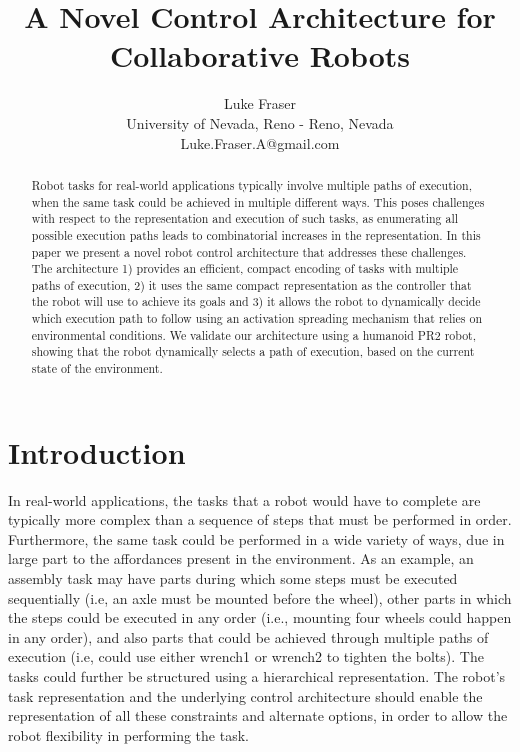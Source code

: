 \documentclass[conference]{article}
\title{A Novel Control Architecture for Collaborative Robots}
\author{Luke Fraser \\ 
University of Nevada, Reno - Reno, Nevada\\
Luke.Fraser.A@gmail.com}
\begin{document}
\maketitle

\begin{abstract}
  Robot tasks for real-world applications typically involve multiple paths of execution, when the same task could be achieved in multiple different ways. This poses challenges with respect to the representation and execution of such tasks, as enumerating all possible execution paths leads to combinatorial increases in the representation. In this paper we present a novel robot control architecture that addresses these challenges. The architecture 1) provides an efficient, compact encoding of tasks with multiple paths of execution, 2) it uses the same compact representation as the controller that the robot will use to achieve its goals and 3) it allows the robot to dynamically decide which execution path to follow using an activation spreading mechanism that relies on environmental conditions. We validate our architecture using a humanoid PR2 robot, showing that the robot dynamically selects a path of execution, based on the current state of the environment.
\end{abstract}

\section{Introduction}
In real-world applications, the tasks that a robot would have to complete are typically more complex than a sequence of steps that must be performed in order. Furthermore, the same task could be performed in a wide variety of ways, due in large part to the affordances present in the environment. As an example, an assembly task may have parts during which some steps must be executed sequentially (i.e, an axle must be mounted before the wheel), other parts in which the steps could be executed in any order (i.e., mounting four wheels could happen in any order), and also parts that could be achieved through multiple paths of execution (i.e, could use either wrench1 or wrench2 to tighten the bolts). The tasks could further be structured using a hierarchical representation. The robot's task representation and the underlying control architecture should enable the representation of all these constraints and alternate options, in order to allow the robot flexibility in performing the task. 
\end{document}
